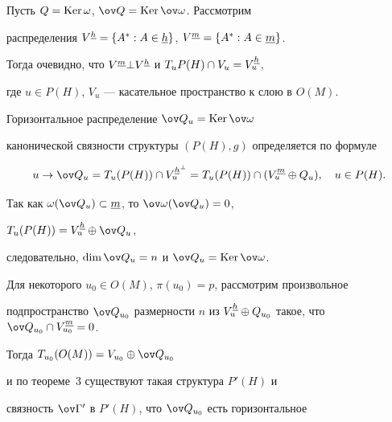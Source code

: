 


Пусть $Q=\operatorname{Ker}\omega$, $\ov Q=\Ker\ov\omega$. Рассмотрим 


распределения $V^{\ul h}=\{A^*:A\in\ul h\}$, $V^{\ul m}=\{A^*:A\in\ul 


m\}$. 


Тогда очевидно, что $V^{\ul m}\bot V^{\ul h}$ и $T_u P(H)\cap V_u=V^{\ul 


h}_u$, 


где $u\in P(H)$, $V_u$ --- касательное пространство к слою в $O(M)$. 


 


\begin{propnonum} 


Горизонтальное распределение $\ov Q_u=\Ker\ov\omega$ 


канонической связности структуры $(P(H),g)$ определяется по формуле 


$$ 


u\to\ov Q_u=T_u(P(H))\cap V^{\ul h^\bot}_u= 


T_u(P(H))\cap(V^{\ul m}_u\oplus Q_u),\quad u\in P(H). 


$$ 


\end{propnonum} 


 


\begin{pf} 


Так как $\omega(\ov Q_u)\subset\ul m$, то $\ov\omega(\ov Q_u)=0$, 


$T_u(P(H))=V^{\ul h}_u\oplus\ov Q_u$, 


следовательно, $\dim\ov Q_u=n$ и $\ov Q_u=\Ker\ov\omega$. 


\end{pf} 


 


Для некоторого $u_0\in O(M)$, $\pi(u_0)=p$, рассмотрим произвольное 


подпространство $\ov Q_{u_0}$ размерности $n$ из $V^{\ul h}_u\oplus 


Q_{u_0}$ такое, что $\ov Q_{u_0}\cap V^{\ul m}_{u_0}=0$. 


Тогда $T_{u_0}(O(M))=V_{u_0}\oplus\ov Q_{u_0}$ 


и по теореме~3 существуют такая структура $P'(H)$ и 


связность $\ov\Gamma{}'$ в $P'(H)$, что $\ov Q_{u_0}$ есть горизонтальное 


